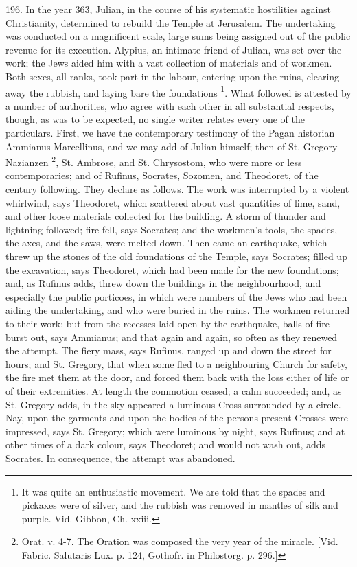 196.
In the year 363, Julian, in the course of his systematic hostilities
against Christianity, determined to rebuild the Temple at Jerusalem.
The undertaking was conducted on a magnificent scale, large sums being
assigned out of the public revenue for its execution. Alypius, an
intimate friend of Julian, was set over the work; the Jews aided him
with a vast collection of materials and of workmen. Both sexes, all
ranks, took part in the labour, entering upon the ruins, clearing away
the rubbish, and laying bare the foundations \footnote{It was quite an enthusiastic movement. We are
told that the spades and pickaxes were of silver, and the rubbish was
removed in mantles of silk and purple. Vid. Gibbon, Ch. xxiii.}. What followed is attested by a number of authorities, who
agree with each other in all substantial respects, though, as was to
be expected, no single writer relates every one of the particulars.
First, we have the contemporary testimony of the Pagan historian
Ammianus Marcellinus, and we may add of Julian himself; then of St.
Gregory Nazianzen \footnote{Orat. v. 4-7. The Oration was composed the very year of the miracle. [Vid.
Fabric. Salutaris Lux. p. 124, Gothofr. in Philostorg. p. 296.]}, St.
Ambrose, and St. Chrysostom, who were more or less contemporaries; and
of Rufinus, Socrates, Sozomen, and Theodoret, of the century
following. They declare as follows. The work was interrupted by a
violent whirlwind, says Theodoret, which scattered about vast
quantities of lime, sand, and other loose materials collected for the
building. A storm of thunder and lightning followed; fire fell,
says Socrates; and the workmen's tools, the spades, the axes, and the
saws, were melted down. Then came an earthquake, which threw up the
stones of the old foundations of the Temple, says Socrates; filled up
the excavation, says Theodoret, which had been made for the new
foundations; and, as Rufinus adds, threw down the buildings in the
neighbourhood, and especially the public porticoes, in which were
numbers of the Jews who had been aiding the undertaking, and who were
buried in the ruins. The workmen returned to their work; but from the
recesses laid open by the earthquake, balls of fire burst out, says
Ammianus; and that again and again, so often as they renewed the
attempt. The fiery mass, says Rufinus, ranged up and down the street
for hours; and St. Gregory, that when some fled to a neighbouring
Church for safety, the fire met them at the door, and forced them back
with the loss either of life or of their extremities. At length the
commotion ceased; a calm succeeded; and, as St. Gregory adds, in the
sky appeared a luminous Cross surrounded by a circle. Nay, upon the
garments and upon the bodies of the persons present Crosses were
impressed, says St. Gregory; which were luminous by night, says
Rufinus; and at other times of a dark colour, says Theodoret; and
would not wash out, adds Socrates. In consequence, the attempt was
abandoned.

